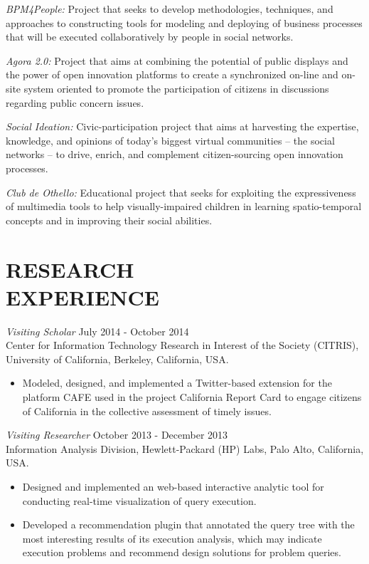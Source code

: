 \documentclass[line,margin]{res}
\begin{document}
\begin{resume}
	{\sl BPM4People:} Project that seeks to develop methodologies, techniques, and approaches to constructing tools for modeling and deploying of business processes that will be executed collaboratively by people in social networks.
	
	{\sl Agora 2.0:} Project that aims at combining the potential of public displays and the power of open innovation platforms to create a synchronized on-line and on-site system oriented to promote the participation of citizens in discussions regarding public concern issues.
	
	{\sl Social Ideation:} Civic-participation project that aims at harvesting the expertise, knowledge, and opinions of today's biggest virtual communities -- the social networks -- to drive, enrich, and complement citizen-sourcing open innovation processes.
	
	{\sl Club de Othello:} Educational project that seeks for exploiting the expressiveness of multimedia tools to help visually-impaired children in learning spatio-temporal concepts and in improving their social abilities.
	
 
\section{RESEARCH \\ EXPERIENCE} 
{\sl Visiting Scholar} \hfill July 2014 - October 2014 \\
Center for Information Technology Research in Interest of the Society (CITRIS), University of California, Berkeley, California, USA.
\begin{itemize}  \itemsep -2pt %
\item Modeled, designed, and implemented a Twitter-based extension for the platform CAFE used in the project California Report Card to engage citizens of California in the collective assessment of timely issues.
\end{itemize}

{\sl Visiting Researcher} \hfill October 2013 - December 2013 \\
Information Analysis Division, Hewlett-Packard (HP) Labs, Palo Alto, California, USA.
\begin{itemize}  \itemsep -2pt %
\item Designed and implemented an web-based interactive analytic tool for conducting real-time visualization of query execution.
\item Developed a recommendation plugin that annotated the query tree with the most interesting results of its execution analysis, which may indicate execution problems and recommend design solutions for problem queries.
\end{itemize}


\end{resume}
\end{document}
